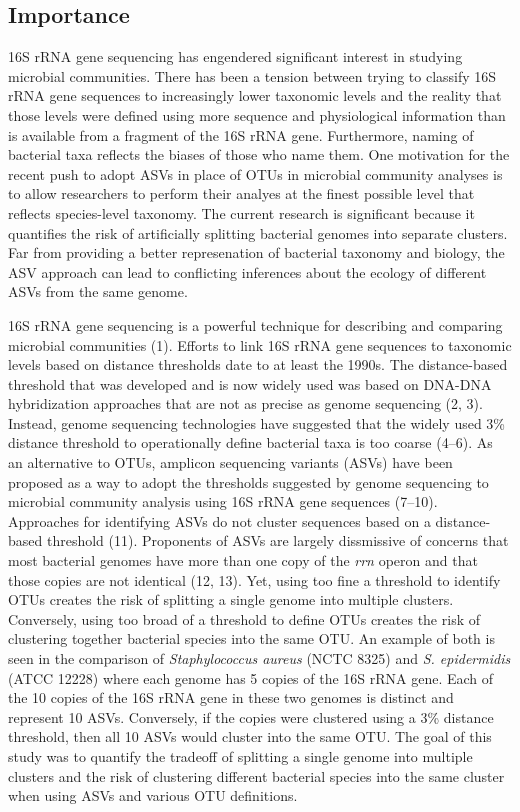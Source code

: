 \documentclass[
]{article}
\begin{document}
\hypertarget{importance}{%
\subsection{Importance}\label{importance}}

16S rRNA gene sequencing has engendered significant interest in studying
microbial communities. There has been a tension between trying to
classify 16S rRNA gene sequences to increasingly lower taxonomic levels
and the reality that those levels were defined using more sequence and
physiological information than is available from a fragment of the 16S
rRNA gene. Furthermore, naming of bacterial taxa reflects the biases of
those who name them. One motivation for the recent push to adopt ASVs in
place of OTUs in microbial community analyses is to allow researchers to
perform their analyes at the finest possible level that reflects
species-level taxonomy. The current research is significant because it
quantifies the risk of artificially splitting bacterial genomes into
separate clusters. Far from providing a better represenation of
bacterial taxonomy and biology, the ASV approach can lead to conflicting
inferences about the ecology of different ASVs from the same genome.

\newpage

16S rRNA gene sequencing is a powerful technique for describing and
comparing microbial communities (1). Efforts to link 16S rRNA gene
sequences to taxonomic levels based on distance thresholds date to at
least the 1990s. The distance-based threshold that was developed and is
now widely used was based on DNA-DNA hybridization approaches that are
not as precise as genome sequencing (2, 3). Instead, genome sequencing
technologies have suggested that the widely used 3\% distance threshold
to operationally define bacterial taxa is too coarse (4--6). As an
alternative to OTUs, amplicon sequencing variants (ASVs) have been
proposed as a way to adopt the thresholds suggested by genome sequencing
to microbial community analysis using 16S rRNA gene sequences (7--10).
Approaches for identifying ASVs do not cluster sequences based on a
distance-based threshold (11). Proponents of ASVs are largely
dissmissive of concerns that most bacterial genomes have more than one
copy of the \emph{rrn} operon and that those copies are not identical
(12, 13). Yet, using too fine a threshold to identify OTUs creates the
risk of splitting a single genome into multiple clusters. Conversely,
using too broad of a threshold to define OTUs creates the risk of
clustering together bacterial species into the same OTU. An example of
both is seen in the comparison of \emph{Staphylococcus aureus} (NCTC
8325) and \emph{S. epidermidis} (ATCC 12228) where each genome has 5
copies of the 16S rRNA gene. Each of the 10 copies of the 16S rRNA gene
in these two genomes is distinct and represent 10 ASVs. Conversely, if
the copies were clustered using a 3\% distance threshold, then all 10
ASVs would cluster into the same OTU. The goal of this study was to
quantify the tradeoff of splitting a single genome into multiple
clusters and the risk of clustering different bacterial species into the
same cluster when using ASVs and various OTU definitions.
\end{document}
